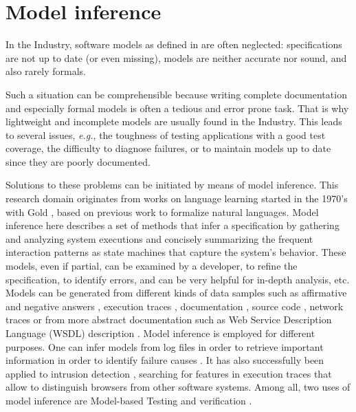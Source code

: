 \section{Model inference}
\label{sec:related:modelinf}

In the Industry, software models as defined in
 are
often neglected: specifications are not up to date (or even
missing), models are neither accurate nor sound, and also rarely
formals.

Such a situation can be comprehensible because writing complete
documentation and especially formal models is often a tedious and
error prone task. That is why lightweight and incomplete models
are usually found in the Industry. This leads to several issues,
\emph{e.g.}, the toughness of testing applications with a good test
coverage, the difficulty to diagnose failures, or to maintain
models up to date since they are poorly documented.

Solutions to these problems can be initiated by means of model
inference. This research domain originates from works on language
learning started in the 1970's with Gold \cite{Gold1978302}, based
on previous work to formalize natural languages. Model inference
here describes a set of methods that infer a specification by
gathering and analyzing system executions and concisely
summarizing the frequent interaction patterns as state machines
that capture the system's behavior. These models, even if
partial, can be examined by a developer, to refine the
specification, to identify errors, and can be very helpful for
in-depth analysis, etc. Models can be generated from different
kinds of data samples such as affirmative and negative answers
\cite{Angluin198787}, execution traces
\cite{Krka:2010:UDE:1810295.1810324}, documentation
\cite{ZhongZXM11}, source code
\cite{Salah05scenariographer,Pradel:2009}, network traces
\cite{6079839} or from more abstract documentation such as Web
Service Description Language (WSDL)
description \cite{Bertolino:2009:ASB:1595696.1595719}.  Model
inference is employed for different purposes. One can infer
models from log files in order to retrieve important information
in order to identify failure causes \cite{4700316}. It has also
successfully been applied to intrusion detection \cite{debar00},
searching for features in execution traces that allow to
distinguish browsers from other software systems. Among all, two
uses of model inference are Model-based Testing
\cite{Lorenzoli2008,tap2011,MobiGUITARIEEESoftware2014} and
verification \cite{Ammons:2002:MS:565816.503275}.

